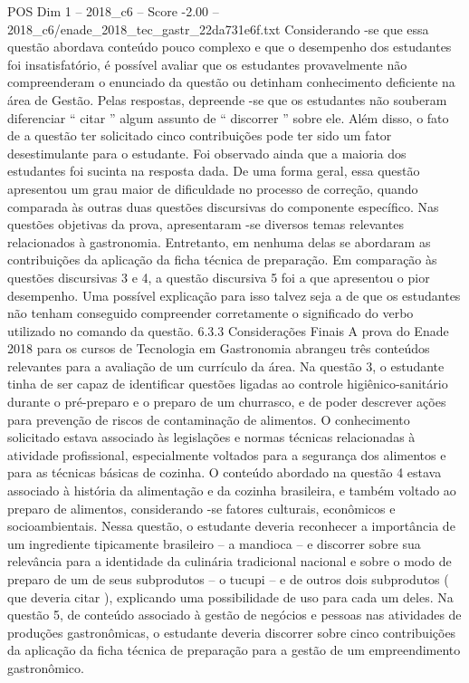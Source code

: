 \begin{textsample}{POS Dim 1 – 2018\_c6 – Score -2.00 – 2018\_c6/enade\_2018\_tec\_gastr\_22da731e6f.txt}
Considerando -se que essa questão abordava conteúdo pouco complexo e que o desempenho dos estudantes foi insatisfatório, é possível avaliar que os estudantes provavelmente não compreenderam o enunciado da questão ou detinham conhecimento deficiente na área de Gestão.
Pelas respostas, depreende -se que os estudantes não souberam diferenciar “ citar ” algum assunto de “ discorrer ” sobre ele.
Além disso, o fato de a questão ter solicitado cinco contribuições pode ter sido um fator desestimulante para o estudante.
Foi observado ainda que a maioria dos estudantes foi sucinta na resposta dada.
De uma forma geral, essa questão apresentou um grau maior de dificuldade no processo de correção, quando comparada às outras duas questões discursivas do componente específico.
Nas questões objetivas da prova, apresentaram -se diversos temas relevantes relacionados à gastronomia.
Entretanto, em nenhuma delas se abordaram as contribuições da aplicação da ficha técnica de preparação.
Em comparação às questões discursivas 3 e 4, a questão discursiva 5 foi a que apresentou o pior desempenho.
Uma possível explicação para isso talvez seja a de que os estudantes não tenham conseguido compreender corretamente o significado do verbo utilizado no comando da questão. 6.3.3 Considerações Finais A prova do Enade 2018 para os cursos de Tecnologia em Gastronomia abrangeu três conteúdos relevantes para a avaliação de um currículo da área.
Na questão 3, o estudante tinha de ser capaz de identificar questões ligadas ao controle higiênico-sanitário durante o pré-preparo e o preparo de um churrasco, e de poder descrever ações para prevenção de riscos de contaminação de alimentos.
O conhecimento solicitado estava associado às legislações e normas técnicas relacionadas à atividade profissional, especialmente voltados para a segurança dos alimentos e para as técnicas básicas de cozinha.
O conteúdo abordado na questão 4 estava associado à história da alimentação e da cozinha brasileira, e também voltado ao preparo de alimentos, considerando -se fatores culturais, econômicos e socioambientais.
Nessa questão, o estudante deveria reconhecer a importância de um ingrediente tipicamente brasileiro – a mandioca – e discorrer sobre sua relevância para a identidade da culinária tradicional nacional e sobre o modo de preparo de um de seus subprodutos – o tucupi – e de outros dois subprodutos ( que deveria citar ), explicando uma possibilidade de uso para cada um deles.
Na questão 5, de conteúdo associado à gestão de negócios e pessoas nas atividades de produções gastronômicas, o estudante deveria discorrer sobre cinco contribuições da aplicação da ficha técnica de preparação para a gestão de um empreendimento gastronômico.

\end{textsample}
